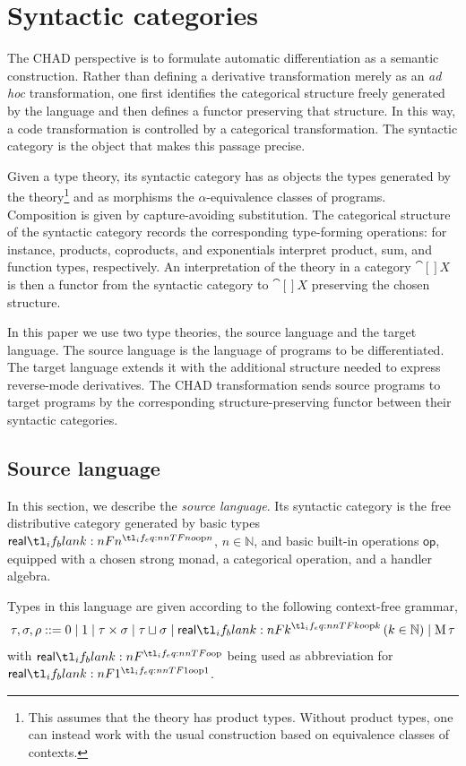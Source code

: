 \documentclass[11pt,a4paper]{article}
\theoremstyle{definition}
\theoremstyle{remark}
\providecommand{\N}{\mathbb{N}}
\providecommand{\srcop}{\mathsf{op}}
\begin{document}
\section{Syntactic categories}

The CHAD perspective is to formulate automatic differentiation as a semantic
construction. Rather than defining a derivative transformation merely as an \textit{ad hoc } transformation, one first identifies the categorical structure
freely generated by the language and then defines a functor preserving that
structure. In this way, a code transformation is controlled by a categorical
transformation. The syntactic category is the object that makes this passage
precise.

Given a type theory, its syntactic category has as objects the types generated
by the theory\footnote{This assumes that the theory has product types. Without
	product types, one can instead work with the usual construction based on
	equivalence classes of contexts.} and as morphisms the
\( \alpha \)-equivalence classes of programs. Composition is given by
capture-avoiding substitution. The categorical structure of the syntactic
category records the corresponding type-forming operations: for instance, products,
coproducts, and exponentials interpret product, sum, and function types,
respectively. An interpretation of the theory in a category \( \cat[]{X} \) is
then a functor from the syntactic category to \( \cat[]{X} \) preserving the
chosen structure.

In this paper we use two type theories, the source language and the target
language. The source language is the language of programs to be differentiated.
The target language extends it with the additional structure needed to express
reverse-mode derivatives. The CHAD transformation sends source programs to
target programs by the corresponding structure-preserving functor between their
syntactic categories.
\subsection{Source language}
\label{sec:source-language}

In this section, we describe the \emph{source language}. Its syntactic category is the free distributive category generated by basic types \( \srcreal[n] \), \( n \in \N \), and basic built-in operations \( \srcop \), equipped with a chosen strong monad, a categorical operation, and a handler algebra.

Types in this language are given according to the following context-free grammar,
\begin{equation}
  \label{eq:source-language-type-construction-grammar}
  \tau, \sigma, \rho
  ::=
  0
  \mid
  1
  \mid
  \tau \times \sigma
  \mid
  \tau \sqcup \sigma
  \mid
  \srcreal[k] \left( k \in \N \right)
  \mid
  \opn[b]{M} \tau
\end{equation}
with \( \srcreal \) being used as abbreviation for \( \srcreal[1] \).
\end{document}
